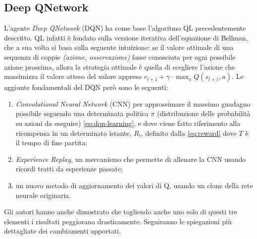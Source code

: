 \documentclass[twoside,twocolumn,10pt]{extarticle}
\theoremstyle{definition}
\begin{document}
	\subsection{Deep Q\texttwelveudash Network}
		L'agente \textit{Deep Q\texttwelveudash Network} (DQN) ha come base l'algoritmo QL precedentemente descritto. QL infatti è fondato sulla versione iterativa dell'equazione di Bellman, che a sua volta si basa sulla seguente intuizione: se il valore ottimale di una sequenza di coppie \textit{(azione, osservazione)} fosse conosciuta per ogni possibile azione prossima, allora la strategia ottimale è quella di scegliere l'azione che massimizza il valore atteso del valore appreso $r_{t + 1} + \gamma \cdot \max_a Q(s_{t + 1}, a)$. Le aggiunte fondamentali del DQN però sono le seguenti:
		\begin{enumerate}
			\item \textit{Convolutional Neural Network} (CNN) per approssimare il massimo guadagno possibile seguendo una determinata politica $\pi$ (distribuzione delle probabilità su azioni da eseguire) \ref{eq:dqn-learning}, e dove viene fatto riferimento alla ricompensa in un determinato istante, $R_t$, definito dalla \ref{eq:reward} dove $T$ è il tempo di fine partita;
			\item \textit{Experience Replay}, un meccanismo che permette di allenare la CNN usando ricordi tratti da esperienze passate;
			\item un nuovo metodo di aggiornamento dei valori di Q, usando un clone della rete neurale originaria.
		\end{enumerate}
		Gli autori hanno anche dimostrato che togliendo anche uno solo di questi tre elementi i risultati peggiorano drasticamente. Seguiranno le spiegazioni più dettagliate dei cambiamenti apportati.
\end{document}
